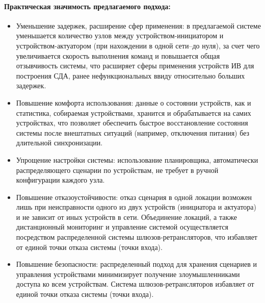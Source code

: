 \documentclass[14pt, a4paper]{extreport}
\begin{document}
\paragraph{Практическая значимость предлагаемого подхода:}
\begin{itemize}
    \item Уменьшение задержек, расширение сфер применения: в предлагаемой системе уменьшается количество узлов между устройством-инициатором и устройством-актуатором (при нахождении в
    одной сети--до нуля), за счет чего увеличивается скорость выполнения команд и повышается общая отзывчивость системы, что расширяет сферы применения устройств ИВ для построения
    СДА, ранее нефункциональных ввиду относительно больших задержек.

    \item Повышение комфорта использования: данные о состоянии устройств, как и статистика, собираемая устройствами, хранится и обрабатывается на самих устройствах, что позволяет
    обеспечить быстрое восстановление состояния системы после внештатных ситуаций (например, отключения питания) без длительной синхронизации.

    \item Упрощение настройки системы: использование планировщика, автоматически распределяющего сценарии по устройствам, не требует в ручной конфигурации каждого узла.
    
    \item Повышение отказоустойчивости: отказ сценария в одной локации возможен лишь при неисправности одного из двух устройств (инициатора и актуатора) и не зависит от иных устройств
    в сети. Объединение локаций, а также дистанционный мониторинг и управление системой осуществляется посредством распределенной системы шлюзов-ретрансляторов, что избавляет от
    единой точки отказа системы (точки входа).
    
    \item Повышение безопасности: распределенный подход для хранения сценариев и управления устройствами минимизирует получение злоумышленниками доступа ко всем устройствам. Система
    шлюзов-ретрансляторов избавляет от единой точки отказа системы (точки входа).

\end{itemize}
\end{document}
